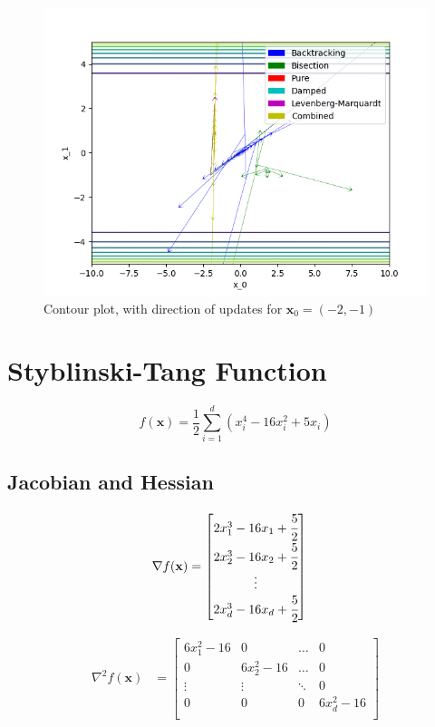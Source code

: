 \documentclass[a4paper]{article}
\begin{document}
\begin{figure}[H]
    \centering
    \includegraphics[width=.75\textwidth]{three_hump_camel_function_cont.png}
    \caption{Contour plot, with direction of updates for $\textbf{x}_0 = (-2, -1)$}
\end{figure}

\section{Styblinski-Tang Function}

$$f(\textbf{x}) = \frac{1}{2} \sum_{i=1}^d (x_i^4 - 16 x_i^2 + 5 x_i)$$

\subsection{Jacobian and Hessian}

\begin{align*}
\nabla f(\textbf{x}) &=
    \begin{bmatrix}
        2 x_1^3 - 16 x_1 + \cfrac{5}{2} \\
        2 x_2^3 - 16 x_2 + \cfrac{5}{2} \\
        \vdots \\
        2 x_d^3 - 16 x_d + \cfrac{5}{2} \\
    \end{bmatrix}
\end{align*}

\begin{align*}
\nabla^2 f(\textbf{x}) &=
    \begin{bmatrix}
        6 x_1^2 - 16 & 0 & \dots & 0 \\
        0 & 6 x_2^2 - 16 & \dots & 0 \\
        \vdots & \vdots & \ddots & 0 \\
        0 & 0 & 0 & 6 x_d^2 - 16 \\
    \end{bmatrix}
\end{align*}
\end{document}
